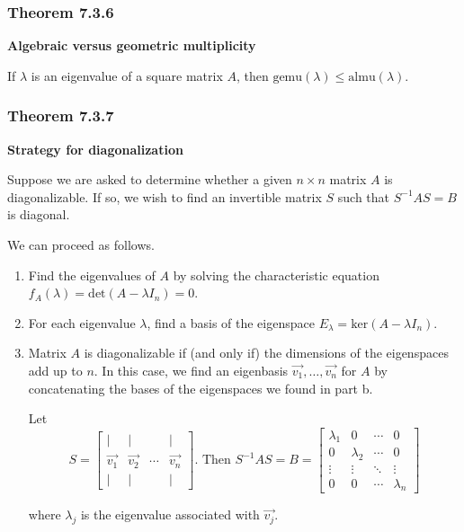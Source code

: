 \documentclass{report}
\begin{document}
\subsubsection*{Theorem 7.3.6}
\par\noindent\textbf{Algebraic versus geometric multiplicity}
\par\noindent If $\lambda{}$ is an eigenvalue of a square matrix $A$, then $\textrm{gemu}(\lambda{})\le{}\textrm{almu}(\lambda{})$.
\subsubsection*{Theorem 7.3.7}
\par\noindent\textbf{Strategy for diagonalization}
\par\noindent Suppose we are asked to determine whether a given $n\times{}n$ matrix $A$ is diagonalizable. If so, we wish to find an invertible matrix $S$ such that $S^{-1}AS=B$ is diagonal.
\par We can proceed as follows.
\renewcommand{\labelenumi}{\textbf{\alph{enumi}.}}
\begin{enumerate}
\item Find the eigenvalues of $A$ by solving the characteristic equation $f_{A}(\lambda{})=\textrm{det}(A-\lambda{}I_{n})=0$.
\item For each eigenvalue $\lambda{}$, find a basis of the eigenspace $E_{\lambda{}}=\textrm{ker}(A-\lambda{}I_{n})$.
\item Matrix $A$ is diagonalizable if (and only if) the dimensions of the eigenspaces add up to $n$. In this case, we find an eigenbasis $\vec{v_{1}},\ldots{},\vec{v_{n}}$ for $A$ by concatenating the bases of the eigenspaces we found in part b.
\par\noindent Let
\[S=\left[\begin{array}{cccc}|&|&&|\\{} \vec{v_{1}}&\vec{v_{2}}&\cdots{}&\vec{v_{n}}\\{} |&|&&|\end{array}\right]\textrm{. Then }S^{-1}AS=B=\left[\begin{array}{cccc}\lambda{}_{1}&0&\cdots{}&0\\ 0&\lambda{}_{2}&\cdots{}&0\\ \vdots{}&\vdots{}&\ddots{}&\vdots{}\\ 0&0&\cdots{}&\lambda{}_{n}\end{array}\right]\]
\par\noindent where $\lambda{}_{j}$ is the eigenvalue associated with $\vec{v_{j}}$.
\end{enumerate}
\end{document}
